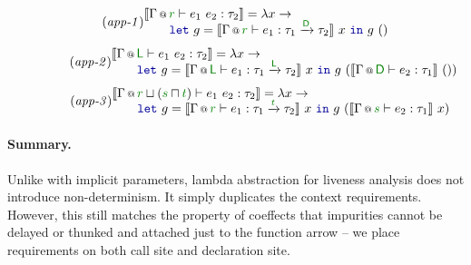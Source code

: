 \begin{figure}
%
%
%
\begin{equation*}
\tag{\emph{app-1}}
\hspace{-0.5em}
\begin{array}{l}
  \sem{\coctx{\Gamma}{\cclrd{r}} \vdash e_1~e_2 : \tau_2 } = \lambda x \rightarrow \\[-0.25em]
  \qquad\kvd{let}~g=\sem{ \coctx{\Gamma}{\cclrd{r}} \vdash e_1 : \tau_1 \xrightarrow{\cclrd{ \ident{D} }} \tau_2 }~x
    ~\kvd{in}~g~()
\end{array}
\end{equation*}
\vspace{-1.0em}
\begin{equation*}
\tag{\emph{app-2}}
\hspace{-0.5em}
\begin{array}{l}
  \sem{\coctx{\Gamma}{\cclrd{\ident{L}}} \vdash e_1~e_2 : \tau_2 } = \lambda x \rightarrow \\[-0.25em]
  \qquad\kvd{let}~g=\sem{ \coctx{\Gamma}{\cclrd{ \ident{L} }} \vdash e_1 : \tau_1 \xrightarrow{\cclrd{ \ident{L} }} \tau_2 }~x
    ~\kvd{in}~g~(\sem{ \coctx{\Gamma}{\cclrd{ \ident{D} }} \vdash e_2 : \tau_1 }~())
\end{array}
\end{equation*}
\vspace{-1.0em}
\begin{equation*}
\tag{\emph{app-3}}
\hspace{-0.5em}
\begin{array}{l}
  \sem{\coctx{\Gamma}{\cclrd{r} \sqcup (\cclrd{s} \sqcap \cclrd{t}) } \vdash e_1~e_2 : \tau_2 } = \lambda x \rightarrow \\[-0.25em]
  \qquad\kvd{let}~g=\sem{ \coctx{\Gamma}{\cclrd{r}} \vdash e_1 : \tau_1 \xrightarrow{\cclrd{t}} \tau_2 }~x
    ~\kvd{in}~g~(\sem{ \coctx{\Gamma}{\cclrd{s}} \vdash e_2 : \tau_1 }~x)
\end{array}
\end{equation*}

\label{fig:applications-flat-livsem}
\end{figure}


\paragraph{Summary.}
Unlike with implicit parameters, lambda abstraction for liveness analysis does not introduce 
non-determinism. It simply duplicates the context requirements. However, this still matches the
property of coeffects that impurities cannot be delayed or thunked and attached just to the 
function arrow -- we place requirements on both call site and declaration site.

